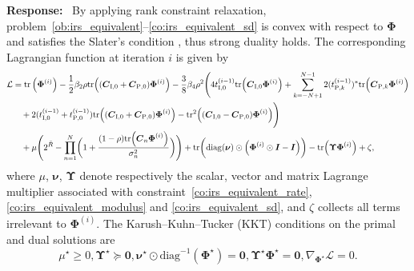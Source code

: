 \documentclass{article}
\newcounter{reviewer}
\newcounter{response}[reviewer]
\newenvironment{response}
	{\refstepcounter{response} \medskip \noindent \textbf{Response:}\ }
	{\medskip}
\begin{document}
\begin{reviewer}
\begin{response}
			By applying rank constraint relaxation, problem~\eqref{ob:irs_equivalent}--\eqref{co:irs_equivalent_sd} is convex with respect to $\boldsymbol{\Phi}$ and satisfies the Slater's condition \cite{M-Boyd2004}, thus strong duality holds. The corresponding Lagrangian function at iteration $i$ is given by
			\begin{align}\label{eq:lagrangian}
				\mathcal{L}
				&= \mathrm{tr}\left(\boldsymbol{\Phi}^{(i)}\right) - \frac{1}{2} \beta_2 \rho \mathrm{tr}\Bigl(
						(\boldsymbol{C}_{\mathrm{I},0} + \boldsymbol{C}_{\mathrm{P},0}) \boldsymbol{\Phi}^{(i)}
					\Bigr) - \frac{3}{8} \beta_4 \rho^2 \Biggl(
						4 t_{\mathrm{I},0}^{(i-1)} \mathrm{tr}\Bigl(
							\boldsymbol{C}_{\mathrm{I},0} \boldsymbol{\Phi}^{(i)}
						\Bigr) + \sum_{k=-N+1}^{N-1} 2 (t_{\mathrm{P},k}^{(i-1)})^* \mathrm{tr}\Bigl(
							\boldsymbol{C}_{\mathrm{P},k} \boldsymbol{\Phi}^{(i)}
						\Bigr)
						\nonumber\\
				&\quad+ 2 (t_{\mathrm{I},0}^{(i-1)} + t_{\mathrm{P},0}^{(i-1)}) \mathrm{tr}\Bigl(
							(\boldsymbol{C}_{\mathrm{I},0} + \boldsymbol{C}_{\mathrm{P},0}) \boldsymbol{\Phi}^{(i)}
						\Bigr) - \mathrm{tr}^2 \Bigl(
							(\boldsymbol{C}_{\mathrm{I},0} - \boldsymbol{C}_{\mathrm{P},0}) \boldsymbol{\Phi}^{(i)}
						\Bigr)
					\Biggr)\nonumber\\
				&\quad+ \mu \Biggl(
					2^{\bar{R}} - \prod_{n=1}^N \biggl(
						1 + \frac{(1-\rho) \mathrm{tr}\Bigl(
							\boldsymbol{C}_n \boldsymbol{\Phi}^{(i)}
						\Bigr)}{\sigma_n^2}
					\biggr)
				\Biggr) + \mathrm{tr}\biggl(
					\mathrm{diag}(\boldsymbol{\nu}) \odot \Bigl(
						\boldsymbol{\Phi}^{(i)} \odot \boldsymbol{I} - \boldsymbol{I}
					\Bigr)
				\biggr) - \mathrm{tr} \Bigl(
					\boldsymbol{\Upsilon} \boldsymbol{\Phi}^{(i)}
				\Bigr) + \zeta,
			\end{align}
			where $\mu$, $\boldsymbol{\nu}$, $\boldsymbol{\Upsilon}$ denote respectively the scalar, vector and matrix Lagrange multiplier associated with constraint~\eqref{co:irs_equivalent_rate}, \eqref{co:irs_equivalent_modulus} and \eqref{co:irs_equivalent_sd}, and $\zeta$ collects all terms irrelevant to $\boldsymbol{\Phi}^{(i)}$. The Karush–Kuhn–Tucker (KKT) conditions on the primal and dual solutions are
			\begin{subequations}
				\begin{equation}\label{eq:lagrange_multiplier}
					\mu^\star \ge 0, \boldsymbol{\Upsilon}^\star \succeq \boldsymbol{0},
				\end{equation}
				\begin{equation}\label{eq:complementary_slackness}
					\boldsymbol{\nu}^\star \odot \mathrm{diag}^{-1}(\boldsymbol{\Phi}^\star) = \boldsymbol{0}, \boldsymbol{\Upsilon}^\star \boldsymbol{\Phi}^\star = \boldsymbol{0},
				\end{equation}
				\begin{equation}\label{eq:gradient}
					\nabla_{\boldsymbol{\Phi}^\star} \mathcal{L} = 0.
				\end{equation}
			\end{subequations}


\end{response}
\end{reviewer}
\end{document}
